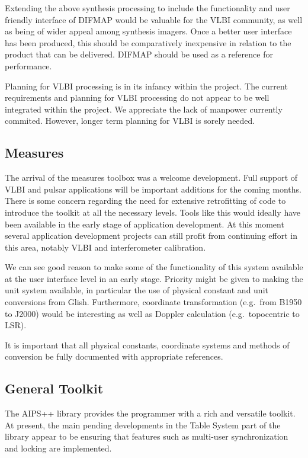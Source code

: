 Extending the above synthesis processing to include the functionality
and user friendly interface of DIFMAP would be valuable for the VLBI
community, as well as being of wider appeal among synthesis imagers.
Once a better user interface has been produced, this should be
comparatively inexpensive in relation to the product that can be
delivered. DIFMAP should be used as a reference for performance.

Planning for VLBI processing is in its infancy within the project. The
current requirements and planning for VLBI processing do not appear to
be well integrated within the project. We appreciate the lack of
manpower currently commited. However, longer term planning for VLBI is
sorely needed.

\subsection{Measures}

The arrival of the measures toolbox was a welcome development. Full
support of VLBI and pulsar applications will be important additions
for the coming months. There is some concern regarding the need for
extensive retrofitting of code to introduce the toolkit at all the
necessary levels. Tools like this would ideally have been available in
the early stage of application development. At this moment several
application development projects can still profit from continuing
effort in this area, notably VLBI and interferometer calibration.

We can see good reason to make some of the functionality of this
system available at the user interface level in an early stage. Priority
might be given to making the unit system available, in particular the
use of physical constant and unit conversions from Glish. Furthermore,
coordinate transformation (e.g.\ from B1950 to J2000) would be
interesting as well as Doppler calculation (e.g.\ topocentric to LSR).

It is important that all physical constants, coordinate systems and
methods of conversion be fully documented with appropriate references.

\subsection{General Toolkit}

The AIPS++ library provides the programmer with a rich and versatile
toolkit. At present, the main pending developments in the Table
System part of the library appear to be ensuring that
features such as multi-user synchronization and locking are
implemented.

